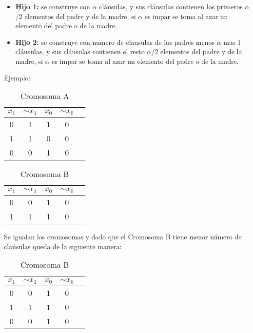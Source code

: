\documentclass[letter]{article}
\begin{document}
\begin{itemize}
	\item \textbf{Hijo 1:} se construye con $\alpha$ cláusulas, y sus cláusulas contienen los primeros $\alpha$/2 elementos del padre y de la madre, si $\alpha$ es impar se toma al azar un elemento del padre o de la madre.
	\item \textbf{Hijo 2:} se construye con numero de clausulas de los padres menos $\alpha$ mas 1 cláusulas, y sus cláusulas contienen el resto $\alpha$/2 elementos del padre y de la madre, si $\alpha$ es impar se toma al azar un elemento del padre o de la madre.
\end{itemize}

Ejemplo:

\begin{table}[H]
	\centering
	\caption{Cromosoma A}
	\begin{tabular}{|c | c | c|  c|  c|}
		\hline
		$x_1$ & $ \sim{x_1}$ & $x_0$ & $ \sim{x_0}$\\
		\hline
		0 & 1& 1 & 0\\
		\hline
		1 & 1& 0 & 0\\
		\hline
		0 & 0& 1 & 0\\
		\hline
	\end{tabular}
\end{table}

\begin{table}[H]
	\centering
	\caption{Cromosoma B}
	\begin{tabular}{|c | c | c|  c|  c|}
		\hline
		$x_1$ & $ \sim{x_1}$ & $x_0$ & $ \sim{x_0}$\\
		\hline
		0 & 0& 1 & 0\\
		\hline
		1 & 1& 1 & 0\\
		\hline
	\end{tabular}
\end{table}

Se igualan los cromosomas y dado que el Cromosoma B tiene menor número de claúsulas queda de la siguiente manera:

\begin{table}[H]
	\centering
	\caption{Cromosoma B}
	\begin{tabular}{|c | c | c|  c|  c|}
		\hline
		$x_1$ & $ \sim{x_1}$ & $x_0$ & $ \sim{x_0}$\\	
		\hline
		0 & 0& 1 & 0\\
		\hline
		1 & 1& 1 & 0\\
		\hline
		0 & 0& 1 & 0\\
		\hline
	\end{tabular}
\end{table}
\end{document}

